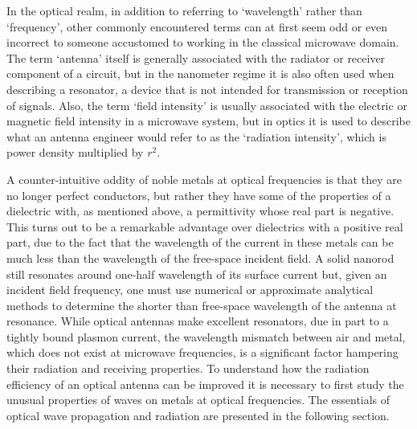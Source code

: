\documentclass[11pt]{article}
\begin{document}
In the optical realm, in addition to referring to `wavelength' rather than `frequency', other commonly encountered terms can at first seem odd or even incorrect to someone accustomed to working in the classical microwave domain. The term `antenna' itself is generally associated with the radiator or receiver component of a circuit, but in the nanometer regime it is also often used when describing a resonator, a device that is not intended for transmission or reception of signals. Also, the term `field intensity' is usually associated with the electric or magnetic field intensity in a microwave system, but in optics it is used to describe what an antenna engineer would refer to as the  `radiation intensity', which is power density multiplied by $r^2$.

A counter-intuitive oddity of noble metals at optical frequencies is that they are no longer perfect conductors, but rather they have some of the properties of a dielectric with, as mentioned above, a permittivity whose real part is negative. This turns out to be a remarkable advantage over dielectrics with a positive real part, due to the fact that the wavelength of the current in these metals can be much less than the wavelength of the free-space incident field. A solid nanorod still resonates around one-half wavelength of its surface current but, given an incident field frequency, one must use numerical or approximate analytical methods to determine the shorter than free-space wavelength of the antenna at resonance. While optical antennas make excellent resonators, due in part to a tightly bound plasmon current, the wavelength mismatch between air and metal, which does not exist at microwave frequencies, is a significant factor hampering their radiation and receiving properties. To understand how the radiation efficiency of an optical antenna can be improved it is necessary to first study the unusual properties of waves on metals at optical frequencies. The essentials of optical wave propagation and radiation are presented in the following section.
\end{document}
